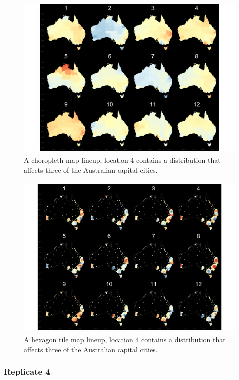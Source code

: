 \documentclass{monashthesis}
\begin{document}
\begin{figure}[H]
\centering
\includegraphics[height=8cm]{lineups/three-geo8-1.pdf}
\caption{\label{fig:three-geo8}A choropleth map lineup, location 4 contains a distribution that affects three of the Australian capital cities.}
\end{figure}

\begin{figure}[H]
\centering
\includegraphics[height=8cm]{lineups/three-hex8-1.pdf}
\caption{\label{fig:three-hex8}A hexagon tile map lineup, location 4 contains a distribution that affects three of the Australian capital cities.}
\end{figure}

\hypertarget{replicate-4-1}{%
\subsubsection{Replicate 4}\label{replicate-4-1}}
\end{document}
